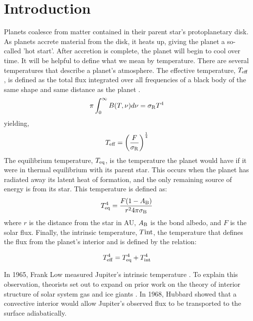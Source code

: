 \documentclass[11pt]{ucscthesisbs}
\begin{document}
\chapter{Introduction}
Planets coalesce from matter contained in their parent star's protoplanetary disk. As planets accrete material from the disk, it heats up, giving the planet a so-called 'hot start'. After accretion is complete, the planet will begin to cool over time. It will be helpful to define what we mean by temperature. There are several temperatures that describe a planet's atmosphere. The effective temperature, $T_{\rm eff}$, is defined as the total flux integrated over all frequencies of a black body of the same shape and same distance as the planet \citep{seager_2010}.
\begin{equation}
    \pi \int_{0}^{\infty} B(T, \nu) d\nu = \sigma_{\rm R}T^{4}
  \label{eq:effective_temp_integral}
\end{equation}  
yielding,
\begin{equation}
    T_{\rm eff} = \bigg(\frac{F}{\sigma_{\rm R}}\bigg)^{\frac{1}{4}} 
  \label{eq:effective_temp}
\end{equation} 
The equilibrium temperature, $T_{\rm eq}$, is the temperature the planet would have if it were in thermal equilibrium with its parent star. This occurs when the planet has radiated away its latent heat of formation, and the only remaining source of energy is from its star. This temperature is defined as:
\begin{equation}
    T_{\rm eq}^4 = \frac{F(1-A_{\rm B})}{r^{2} 4 \pi \sigma_{\rm B}}
  \label{eq:equilibrium_temp}
\end{equation} 
where $r$ is the distance from the star in AU, $A_{\rm B}$ is the bond albedo, and $F$ is the solar flux. Finally, the intrinsic temperature, $T{\rm int}$, the temperature that defines the flux from the planet's interior and is defined by the relation:

\begin{equation}
    T_{\rm eff}^4 =  T_{\rm eq}^4 +  T_{\rm int}^4
  \label{eq:effective_temp}
\end{equation} 

In 1965, Frank Low measured Jupiter's intrinsic temperature \citep{low_1966}. To explain this observation, theorists set out to expand on prior work \citep{demarcus_1958} on the theory of interior structure of solar system gas and ice giants \citep{hubbard_1968, smoluchowski_1967,hubbard_1977, hubbard_1977_2, podolak_1991}. In 1968, Hubbard showed that a convective interior would allow Jupiter's observed flux to be transported to the surface adiabatically.
\end{document}
